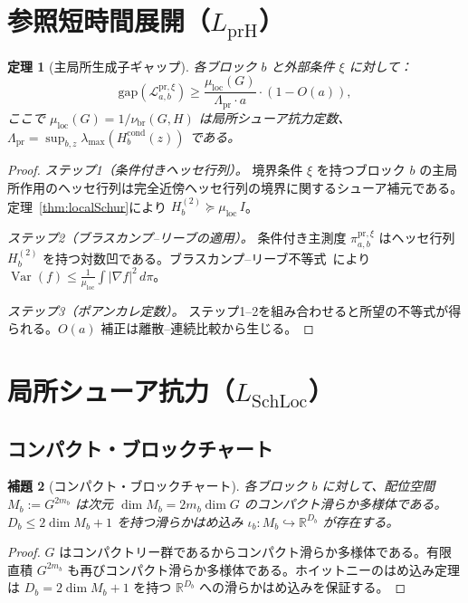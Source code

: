 \documentclass[12pt]{article}
\theoremstyle{plain}
\newtheorem{theorem}{定理}[section]
\newtheorem{lemma}[theorem]{補題}
\theoremstyle{definition}
\numberwithin{equation}{section}
\newcommand{\R}{\mathbb{R}}
\newcommand{\Var}{\operatorname{Var}}
\newcommand{\pr}{\mathrm{pr}}
\newcommand{\loc}{\mathrm{loc}}
\newcommand{\br}{\mathrm{br}}
\begin{document}
\section{参照短時間展開（$L_{\mathrm{prH}}$）}\label{sec:LprH}

\begin{theorem}[主局所生成子ギャップ]\label{thm:LprH}
各ブロック $b$ と外部条件 $\xi$ に対して：
\begin{equation}
\mathrm{gap}(\mathcal{L}_{a,b}^{\pr,\xi}) \geq \frac{\mu_{\loc}(G)}{\Lambda_{\pr}\cdot a}\cdot(1-O(a)),
\end{equation}
ここで $\mu_{\loc}(G)=1/\nu_{\br}(G,H)$ は局所シューア抗力定数、$\Lambda_{\pr}=\sup_{b,z}\lambda_{\max}(H_b^{\mathrm{cond}}(z))$ である。
\end{theorem}

\begin{proof}
\emph{ステップ1（条件付きヘッセ行列）。} 境界条件 $\xi$ を持つブロック $b$ の主局所作用のヘッセ行列は完全近傍ヘッセ行列の境界に関するシューア補元である。定理~\ref{thm:localSchur}により $H_b^{(2)}\succeq\mu_{\loc}\,I$。

\emph{ステップ2（ブラスカンプ--リーブの適用）。} 条件付き主測度 $\pi_{a,b}^{\pr,\xi}$ はヘッセ行列 $H_b^{(2)}$ を持つ対数凹である。ブラスカンプ--リーブ不等式~\cite{BrascampLieb}により $\Var(f)\leq\frac{1}{\mu_{\loc}}\int|\nabla f|^2\,d\pi$。

\emph{ステップ3（ポアンカレ定数）。} ステップ1--2を組み合わせると所望の不等式が得られる。$O(a)$ 補正は離散--連続比較から生じる。
\end{proof}


\section{局所シューア抗力（$L_{\mathrm{SchLoc}}$）}\label{sec:LSchLoc}

\subsection{コンパクト・ブロックチャート}

\begin{lemma}[コンパクト・ブロックチャート]\label{lem:compactchart}
各ブロック $b$ に対して、配位空間 $M_b:=G^{2m_b}$ は次元 $\dim M_b=2m_b\dim G$ のコンパクト滑らか多様体である。$D_b\leq 2\dim M_b+1$ を持つ滑らかはめ込み $\iota_b:M_b\hookrightarrow\R^{D_b}$ が存在する。
\end{lemma}

\begin{proof}
$G$ はコンパクトリー群であるからコンパクト滑らか多様体である。有限直積 $G^{2m_b}$ も再びコンパクト滑らか多様体である。ホイットニーのはめ込み定理は $D_b=2\dim M_b+1$ を持つ $\R^{D_b}$ への滑らかはめ込みを保証する。
\end{proof}
\end{document}

